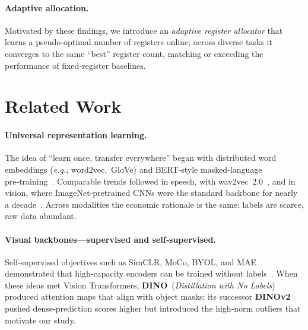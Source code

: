 \documentclass{article}
\newcommand{\citep}{\parencite}
\begin{document}
\paragraph{Adaptive allocation.}
Motivated by these findings, we introduce an \emph{adaptive register allocator} that learns a pseudo‑optimal number of registers online; across diverse tasks it converges to the same “best” register count, matching or exceeding the performance of fixed‑register baselines.



\section{Related Work}
\label{sec:related}

\paragraph{Universal representation learning.}
The idea of “learn once, transfer everywhere” began with distributed word embeddings (\emph{e.g.}, word2vec, GloVe) and BERT‑style masked‑language pre‑training \citep{devlinBERTPretrainingDeep2019}.
Comparable trends followed in speech, with wav2vec 2.0 \citep{baevskiWav2vec20Framework2020a}, and in vision, where ImageNet‑pretrained CNNs were the standard backbone for nearly a decade \citep{krizhevskyImageNetClassificationDeep2012}.  
Across modalities the economic rationale is the same: labels are scarce, raw data abundant.

\paragraph{Visual backbones—supervised and self‑supervised.}
Self‑supervised objectives such as SimCLR, MoCo, BYOL, and MAE demonstrated that high‑capacity encoders can be trained without labels \citep{chenSimpleFrameworkContrastive2020,heMomentumContrastUnsupervised,grillBootstrapYourOwn2020,heMaskedAutoencodersAre2022}.  
When these ideas met Vision Transformers, \textbf{DINO} (\emph{Distillation with No Labels}) \citep{caronEmergingPropertiesSelfsupervised2021} produced attention maps that align with object masks; its successor \textbf{DINOv2} \citep{oquabDINOv2LearningRobust2024} pushed dense‑prediction scores higher but introduced the high‑norm outliers that motivate our study.
\end{document}
